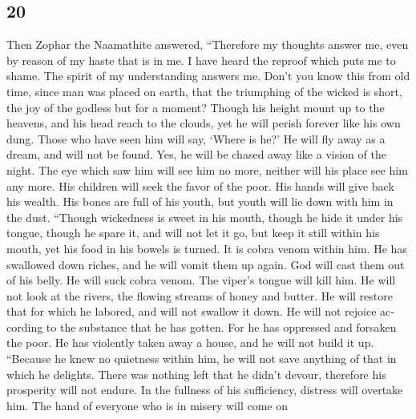 \begin{paracol}{2}
\switchcolumn
\begin{otherlanguage}{english}

\hypertarget{section-39}{%
\section{20}\label{section-39}}

 Then Zophar the Naamathite answered, 
``Therefore my thoughts answer me, even by reason of my haste that is in
me.  I have heard the reproof which puts me to shame. The
spirit of my understanding answers me.  Don't you know
this from old time, since man was placed on earth,  that
the triumphing of the wicked is short, the joy of the godless but for a
moment?  Though his height mount up to the heavens, and
his head reach to the clouds,  yet he will perish forever
like his own dung. Those who have seen him will say, `Where is he?'
 He will fly away as a dream, and will not be found. Yes,
he will be chased away like a vision of the night.  The
eye which saw him will see him no more, neither will his place see him
any more.  His children will seek the favor of the poor.
His hands will give back his wealth.  His bones are full
of his youth, but youth will lie down with him in the dust.
 ``Though wickedness is sweet in his mouth, though he
hide it under his tongue,  though he spare it, and will
not let it go, but keep it still within his mouth,  yet
his food in his bowels is turned. It is cobra venom within him.
 He has swallowed down riches, and he will vomit them up
again. God will cast them out of his belly.  He will suck
cobra venom. The viper's tongue will kill him.  He will
not look at the rivers, the flowing streams of honey and butter.
 He will restore that for which he labored, and will not
swallow it down. He will not rejoice according to the substance that he
has gotten.  For he has oppressed and forsaken the poor.
He has violently taken away a house, and he will not build it up.
 ``Because he knew no quietness within him, he will not
save anything of that in which he delights.  There was
nothing left that he didn't devour, therefore his prosperity will not
endure.  In the fullness of his sufficiency, distress
will overtake him. The hand of everyone who is in misery will come on

\end{otherlanguage}
\end{paracol}
